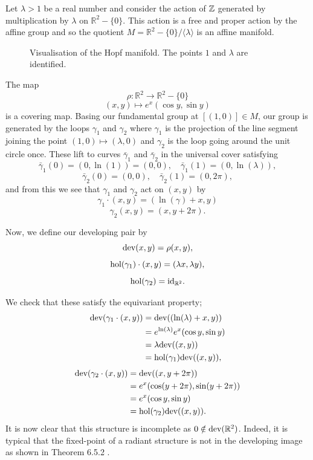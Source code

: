 \begin{eg}\label{eg:hopf-manifold}
    Let $\lambda >1$ be a real number and consider the action of $\mathbb{Z}$ generated by multiplication by $\lambda$ on $\mathbb{R}^2- \{0\}$. This action is a free and proper action by the affine group and so the quotient
    $M = \mathbb{R}^2- \{0\} / \langle\lambda\rangle$ is an affine manifold.

    \begin{figure}[H]
        \centering
        \caption{Visualisation of the Hopf manifold. The points $1$ and $\lambda$ are identified.}
    \end{figure}

    The map $$\rho : \mathbb{R}^2 \to \mathbb{R}^2- \{0\}$$ $$(x,y) \mapsto e^x
        (\cos y, \sin y)$$ is a covering map. Basing our fundamental group at $[(1,0)]
        \in M$, our group is generated by the loops $\gamma_1$ and $\gamma_2$ where
    $\gamma_1$ is the projection of the line segment joining the point $(1,0)
        \mapsto (\lambda, 0)$ and $\gamma_2$ is the loop going around the unit circle
    once. These lift to curves $\bar{\gamma}_1$ and $\bar{\gamma}_2$ in the
    universal cover satisfying $$\bar{\gamma}_1(0) = (0,\ln(1)) = (0,0), \quad
        \bar{\gamma}_1(1) = (0,\ln(\lambda)) ,$$ $$\bar{\gamma}_2(0) = (0, 0) , \quad
        \bar{\gamma}_2(1) = (0, 2\pi),$$ and from this we see that $\gamma_1$ and
    $\gamma_2$ act on $(x,y)$ by $$\gamma_1 \cdot (x,y) = (\ln(\gamma) + x, y)$$
    $$\gamma_2(x,y) = (x, y + 2\pi).$$

    Now, we define our developing pair by $$\text{dev}(x,y) = \rho(x,y),$$
    $$\text{hol}(\gamma_1)\cdot (x,y) = (\lambda x, \lambda y),$$ $$\text{hol}(\gamma_2) =
        \text{id}_{\mathbb{R}^2}.$$

    We check that these satisfy the equivariant property;
    \begin{align*}
        \text{dev}(\gamma_1\cdot(x,y)) & = \text{dev}((\ln(\lambda) + x,y))          \\
                                 & = e^{\ln(\lambda)}e^x(\cos y, \sin y) \\
                                 & = \lambda \text{dev}((x,y))                 \\
                                 & = \text{hol}(\gamma_1) \text{dev}((x,y)),
    \end{align*}
    \begin{align*}
        \text{dev}(\gamma_2\cdot(x,y)) & = \text{dev}((x,y + 2\pi))                  \\
                                 & = e^x(\cos (y+ 2\pi), \sin (y+ 2\pi)) \\
                                 & = e^x(\cos y, \sin y)                 \\
                                 & = \text{hol}(\gamma_2) \text{dev}((x,y)).
    \end{align*}
    It is now clear that this structure is incomplete as $0 \notin \text{dev}(\mathbb{R}^2)$. Indeed, it is typical that the fixed-point of a radiant structure is not in the developing image as shown in Theorem 6.5.2 \cite{goldman2022geometric}.
\end{eg}


